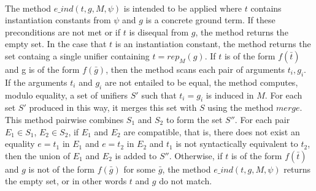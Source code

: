 \documentclass{llncs}
\begin{document}
\ \\

The method $e\_ind(t,g,M,\psi)$ is intended to be applied where $t$ contains instantiation constants from $\psi$ and $g$ is a concrete ground term.
If these preconditions are not met or if $t$ is disequal from $g$, the method returns the empty set.
In the case that $t$ is an instantiation constant, the method returns the set containg a single unifier containing $t = rep_M( g )$.
If $t$ is of the form $f(\bar{t})$ and g is of the form $f(\bar{g})$, then the method scans each pair of arguments $t_i, g_i$.
If the arguments $t_i$ and $g_i$ are not entailed to be equal, the method computes, modulo equality, a set of unifiers $S'$ such that $t_i = g_i$ is induced in $M$.
For each set $S'$ produced in this way, it merges this set with $S$ using the method $merge$.
This method pairwise combines $S_1$ and $S_2$ to form the set $S''$.
For each pair $E_1 \in S_1$, $E_2 \in S_2$, if $E_1$ and $E_2$ are compatible, that is, there does not exist an equality $e = t_1$ in $E_1$ and $e = t_2$ in $E_2$ and $t_1$ is not syntactically equivalent to $t_2$, then the union of $E_1$ and $E_2$ is added to $S''$.
Otherwise, if $t$ is of the form $f(\bar{t})$ and $g$ is not of the form $f( \bar{g})$ for some $\bar{g}$, the method $e\_ind(t,g,M, \psi)$ returns the empty set, or in other words $t$ and $g$ do not match.
\end{document}
